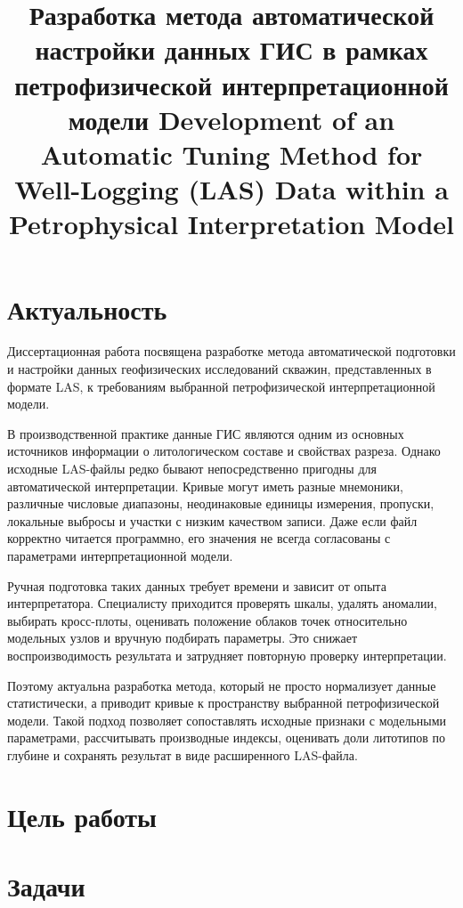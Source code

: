 \documentclass[master,summary]{pmk-graduate}
\title{%
Разработка метода автоматической настройки данных ГИС в рамках
петрофизической интерпретационной модели%
\english
Development of an Automatic Tuning Method for Well-Logging (LAS) Data within a
Petrophysical Interpretation Model%
}
\begin{document}
\maketitlepage

\section{Актуальность}

Диссертационная работа посвящена разработке метода автоматической подготовки и настройки данных геофизических исследований скважин, представленных в формате LAS, к требованиям выбранной петрофизической интерпретационной модели.

В производственной практике данные ГИС являются одним из основных источников информации о литологическом составе и свойствах разреза. Однако исходные LAS-файлы редко бывают непосредственно пригодны для автоматической интерпретации. Кривые могут иметь разные мнемоники, различные числовые диапазоны, неодинаковые единицы измерения, пропуски, локальные выбросы и участки с низким качеством записи. Даже если файл корректно читается программно, его значения не всегда согласованы с параметрами интерпретационной модели.

Ручная подготовка таких данных требует времени и зависит от опыта интерпретатора. Специалисту приходится проверять шкалы, удалять аномалии, выбирать кросс-плоты, оценивать положение облаков точек относительно модельных узлов и вручную подбирать параметры. Это снижает воспроизводимость результата и затрудняет повторную проверку интерпретации.

Поэтому актуальна разработка метода, который не просто нормализует данные статистически, а приводит кривые к пространству выбранной петрофизической модели. Такой подход позволяет сопоставлять исходные признаки с модельными параметрами, рассчитывать производные индексы, оценивать доли литотипов по глубине и сохранять результат в виде расширенного LAS-файла.

\section{Цель работы}

\goalname

\section{Задачи}
\end{document}
